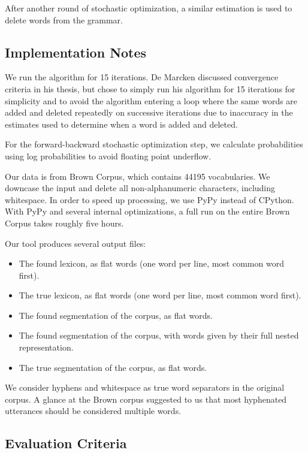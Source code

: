 \documentclass[11pt, oneside, fleqn]{article}
\begin{document}
  After another round of stochastic optimization, a similar estimation is used to delete words from the grammar. 
  
  \subsection*{Implementation Notes}
  
  We run the algorithm for 15 iterations. De Marcken discussed convergence criteria in his thesis, but chose to simply run his algorithm for 15 iterations for simplicity and to avoid the algorithm entering a loop where the same words are added and deleted repeatedly on successive iterations due to inaccuracy in the estimates used to determine when a word is added and deleted.
  
  For the forward-backward stochastic optimization step, we calculate probabilities using log probabilities to avoid floating point underflow.

  Our data is from Brown Corpus, which contains 44195 vocabularies. We downcase the input and delete all non-alphanumeric characters, including whitespace. In order to speed up processing, we use PyPy instead of CPython. With PyPy and several internal optimizations, a full run on the entire Brown Corpus takes roughly five hours.
  
  Our tool produces several output files:

  \begin{itemize}
    \item The found lexicon, as flat words (one word per line, most common word first).
    \item The true lexicon, as flat words (one word per line, most common word first).
    \item The found segmentation of the corpus, as flat words.
    \item The found segmentation of the corpus, with words given by their full nested representation.
    \item The true segmentation of the corpus, as flat words. 
  \end{itemize}

	We consider hyphens and whitespace as true word separators in the original corpus. A glance at the Brown corpus suggested to us that most hyphenated utterances should be considered multiple words.

  \subsection*{Evaluation Criteria}
\end{document}
